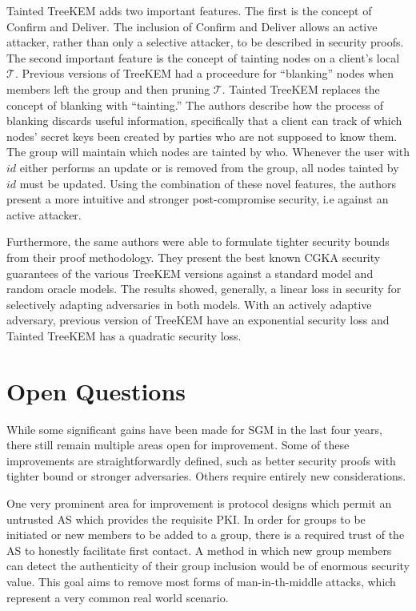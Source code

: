 \documentclass[12pt,twocolumn]{article}
\begin{document}
	Tainted TreeKEM adds two important features.
	The first is the concept of Confirm and Deliver.
	The inclusion of Confirm and Deliver allows an active attacker, rather than only a selective attacker, to be described in security proofs.
	The second important feature is the concept of tainting nodes on a client's local $\mathcal{T}$.
	Previous versions of TreeKEM had a proceedure for ``blanking'' nodes when members left the group and then pruning $\mathcal{T}$.
	Tainted TreeKEM replaces the concept of blanking with ``tainting.''
	The authors describe how the process of blanking discards useful information, specifically that a client can track of which nodes' secret keys been created by parties who are not supposed to	know them.
	The group will maintain which nodes are tainted by who.
	Whenever the user with $id$ either performs an update or is removed from the group, all nodes tainted by $id$ must be updated.
	Using the combination of these novel features, the authors present a more intuitive and stronger post-compromise security, i.e against an active attacker. 
	
	Furthermore, the same authors were able to formulate tighter security bounds from their proof methodology.
	They present the best known CGKA security guarantees of the various TreeKEM versions against a standard model and random oracle models.
	The results showed, generally, a linear loss in security for selectively adapting adversaries in both models.
	With an actively adaptive adversary, previous version of TreeKEM have an exponential security loss and Tainted TreeKEM has a quadratic security loss.
	
	\section*{Open Questions}
	
	While some significant gains have been made for SGM in the last four years, there still remain multiple areas open for improvement.
	Some of these improvements are straightforwardly defined, such as better security proofs with tighter bound or stronger adversaries.
	Others require entirely new considerations.
	
	One very prominent area for improvement is protocol designs which permit an untrusted AS which provides the requisite PKI.
	In order for groups to be initiated or new members to be added to a group, there is a required trust of the AS to honestly facilitate first contact.
	A method in which new group members can detect the authenticity of their group inclusion would be of enormous security value.
	This goal aims to remove most forms of man-in-th-middle attacks, which represent a very common real world scenario.
	
\end{document}
